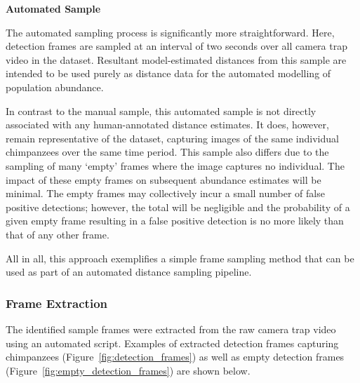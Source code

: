 \vspace{5mm}
\textbf{Automated Sample}

The automated sampling process is significantly more straightforward.
Here, detection frames are sampled at an interval of two seconds over all camera trap video in
the dataset.
Resultant model-estimated distances from this sample are intended to be used purely as distance
data for the automated modelling of population abundance.

In contrast to the manual sample, this automated sample is not directly associated with any
human-annotated distance estimates.
It does, however, remain representative of the dataset, capturing images of the same individual
chimpanzees over the same time period.
This sample also differs due to the sampling of many `empty' frames where the image captures no
individual.
The impact of these empty frames on subsequent abundance estimates will be minimal.
The empty frames may collectively incur a small number of false positive detections; however,
the total will be negligible and the probability of a given empty frame resulting in a false
positive detection is no more likely than that of any other frame.

All in all, this approach exemplifies a simple frame sampling method that can be used as part of
an automated distance sampling pipeline.

\vspace{-2.5mm}

\subsubsection{Frame Extraction}
The identified sample frames were extracted from the raw camera trap video using an automated
script.
Examples of extracted detection frames capturing chimpanzees (Figure~\ref{fig:detection_frames})
as well as empty detection frames (Figure~\ref{fig:empty_detection_frames}) are shown below.

\vspace{5mm}

